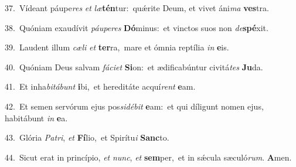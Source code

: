 {\numbfont\textcolor{\numbcolor}{37.}}~Vídeant páupe\textit{res} \textit{et} \textit{læ}\-\textbf{tén}tur:~\star quǽrite Deum, et vivet áni\textit{ma} \textbf{ves}\-tra.\par
{\numbfont\textcolor{\numbcolor}{38.}}~Quóniam exaudívit \textit{páu}\-\textit{pe}\textit{res} \textbf{Dó}\-minus:~\star et vinctos suos non \textit{de}\-\textbf{spé}xit.\par
{\numbfont\textcolor{\numbcolor}{39.}}~Laudent illum \textit{cæ}\-\textit{li} \textit{et} \textbf{ter}\-ra,~\star mare et ómnia reptília \textit{in} \textbf{e}\-is.\par
{\numbfont\textcolor{\numbcolor}{40.}}~Quóniam Deus salvam \textit{fá}\-\textit{ci}\textit{et} \textbf{Si}\-on:~\star et ædificabúntur civitá\textit{tes} \textbf{Ju}\-da.\par
{\numbfont\textcolor{\numbcolor}{41.}}~Et inha\-\textit{bi}\-\textit{tá}\textit{bunt} \textbf{i}\-bi,~\star et hereditáte acquí\textit{rent} \textbf{e}\-am.\par
{\numbfont\textcolor{\numbcolor}{42.}}~Et semen servórum ejus pos\-\textit{si}\-\textit{dé}\textit{bit} \textbf{e}\-am:~\star et qui díligunt nomen ejus, habitábunt \textit{in} \textbf{e}\-a.\par
{\numbfont\textcolor{\numbcolor}{43.}}~Glória \textit{Pa}\-\textit{tri}, \textit{et} \textbf{Fí}\-lio,~\star et Spirítu\textit{i} \textbf{Sanc}\-to.\par
{\numbfont\textcolor{\numbcolor}{44.}}~Sicut erat in princípio, \textit{et} \textit{nunc}\-, \textit{et} \textbf{sem}\-per,~\star et in sǽcula sæculó\-\textit{rum}\-. \textbf{A}\-men.\par
